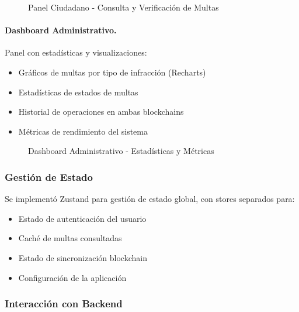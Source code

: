 \begin{figure}[htbp]
    \centering
    \caption{Panel Ciudadano - Consulta y Verificación de Multas}
    \label{fig:ui_panel_ciudadano}
\end{figure}

\paragraph{Dashboard Administrativo.}
Panel con estadísticas y visualizaciones:
\begin{itemize}
    \item Gráficos de multas por tipo de infracción (Recharts)
    \item Estadísticas de estados de multas
    \item Historial de operaciones en ambas blockchains
    \item Métricas de rendimiento del sistema
\end{itemize}

\begin{figure}[htbp]
    \centering
    \caption{Dashboard Administrativo - Estadísticas y Métricas}
    \label{fig:ui_dashboard}
\end{figure}

\subsubsection{Gestión de Estado}

Se implementó Zustand para gestión de estado global, con stores separados para:
\begin{itemize}
    \item Estado de autenticación del usuario
    \item Caché de multas consultadas
    \item Estado de sincronización blockchain
    \item Configuración de la aplicación
\end{itemize}

\subsubsection{Interacción con Backend}

